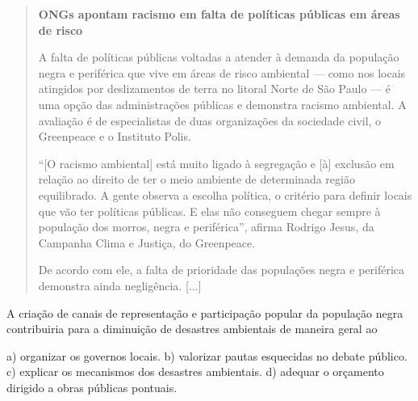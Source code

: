 \begin{quote}
\textbf{ONGs apontam racismo em falta de políticas públicas em áreas de risco}

A falta de políticas públicas voltadas a atender à demanda da população negra e periférica que vive em áreas de risco ambiental –-- como nos locais atingidos por deslizamentos de terra no litoral Norte de São Paulo --- é uma opção das administrações públicas e demonstra racismo ambiental. A avaliação é de especialistas de duas organizações da sociedade civil, o Greenpeace e o Instituto Polis.

``[O racismo ambiental] está muito ligado à segregação e [à] exclusão em relação ao direito de ter o meio ambiente de determinada região equilibrado. A gente observa a escolha política, o critério para definir locais que vão ter políticas públicas. E elas não conseguem chegar sempre à população dos morros, negra e periférica'', afirma Rodrigo Jesus, da Campanha Clima e Justiça, do Greenpeace.

De acordo com ele, a falta de prioridade das populações negra e periférica demonstra ainda negligência. {[}...{]}

\end{quote}

A criação de canais de representação e participação popular da população
negra contribuiria para a diminuição de desastres ambientais de maneira
geral ao

a)  organizar os governos locais.
b)  valorizar pautas esquecidas no debate público.
c)  explicar os mecanismos dos desastres ambientais.
d)  adequar o orçamento dirigido a obras públicas pontuais.



